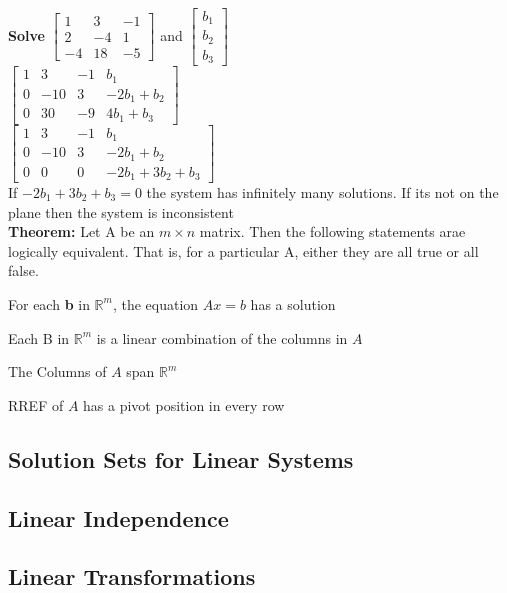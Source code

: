 \documentclass{article}
\begin{document}
\\\textbf{Solve}
$\left[\begin{array}{ccc}1&3&-1\\2&-4&1\\-4&18&-5\end{array}\right]$ and $\left[\begin{array}{c}b_1\\b_2\\b_3\end{array}\right]$
\\$\left[\begin{array}{cccc}1&3&-1&b_1\\0&-10&3&-2b_1+b_2\\0&30&-9&4b_1+b_3\end{array}\right]$ 
\\[0.1in]$\left[\begin{array}{cccc}1&3&-1&b_1\\0&-10&3&-2b_1+b_2\\0&0&0&-2b_1+3b_2+b_3\end{array}\right]$ 
\\If $-2b_1+3b_2+b_3=0$ the system has infinitely many solutions. If its not on the plane then the system is inconsistent
\\\textbf{Theorem: }Let A be an $m\times n$ matrix. Then the following statements arae logically equivalent. That is, for a particular A, either they are all true or all false.
\begin{list}{a}
    \item For each \textbf{b} in $\mathbb{R}^m$, the equation $Ax=b$ has a solution
    \item Each B in $\mathbb{R}^m$ is a linear combination of the columns in $A$
    \item The Columns of $A$ span $\mathbb{R}^m$
    \item RREF of $A$ has a pivot position in every row
\end{list}
\subsection{Solution Sets for Linear Systems}
\subsection{Linear Independence}
\subsection{Linear Transformations}
\end{document}
